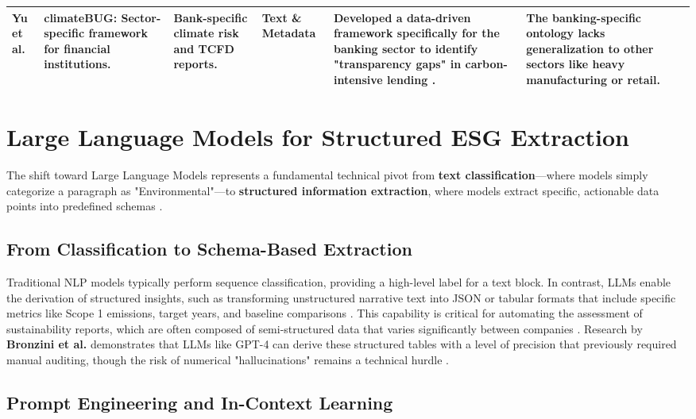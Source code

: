 \begin{landscape}
\begin{table}[p]
\begin{tabularx}{\linewidth}{|p{1.8cm}|p{3.5cm}|p{3cm}|p{1.8cm}|X|X|}
\textbf{Yu et al.}  \parencite{yinan_yu_e282fd98} & \textbf{climateBUG}: Sector-specific framework for financial institutions. & Bank-specific climate risk and TCFD reports. & Text \& Metadata & Developed a data-driven framework specifically for the banking sector to identify "transparency gaps" in carbon-intensive lending  \parencite{yinan_yu_e282fd98}. & The banking-specific ontology lacks generalization to other sectors like heavy manufacturing or retail. \\ \hline
\end{tabularx}
\end{table}
\end{landscape}



\section{Large Language Models for Structured ESG Extraction}

The shift toward Large Language Models represents a fundamental technical pivot from \textbf{text classification}—where models simply categorize a paragraph as "Environmental"—to \textbf{structured information extraction}, where models extract specific, actionable data points into predefined schemas  \parencite[]{seyed_alireza_mousavian_anaraki_b56a1c0f, marco_bronzini_bf94d949}.
\subsection{From Classification to Schema-Based Extraction}

Traditional NLP models typically perform sequence classification, providing a high-level label for a text block. In contrast, LLMs enable the derivation of structured insights, such as transforming unstructured narrative text into JSON or tabular formats that include specific metrics like Scope 1 emissions, target years, and baseline comparisons  \parencite{marco_bronzini_bf94d949}. This capability is critical for automating the assessment of sustainability reports, which are often composed of semi-structured data that varies significantly between companies  \parencite[]{jacob_beck_9548a833, marco_bronzini_bf94d949}. Research by \textbf{Bronzini et al.} demonstrates that LLMs like GPT-4 can derive these structured tables with a level of precision that previously required manual auditing, though the risk of numerical "hallucinations" remains a technical hurdle  \parencite{marco_bronzini_bf94d949}.
\subsection{Prompt Engineering and In-Context Learning}

